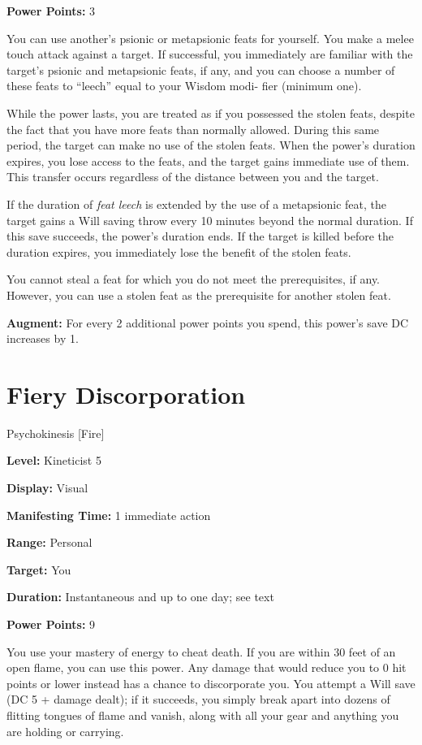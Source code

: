 \documentclass{article}
\begin{document}
\textbf{Power Points:} 3

You can use another's psionic or metapsionic feats for yourself. You make a melee 
touch attack against a target. If successful, you immediately are familiar with 
the target's psionic and metapsionic feats, if any, and you can choose a number 
of these feats to ``leech'' equal to your Wisdom modi- fier (minimum one).

While the power lasts, you are treated as if you possessed the stolen feats, despite 
the fact that you have more feats than normally allowed. During this same period, 
the target can make no use of the stolen feats. When the power's duration expires, 
you lose access to the feats, and the target gains immediate use of them. This 
transfer occurs regardless of the distance between you and the target.

If the duration of \textit{feat leech }is extended by the use of a metapsionic 
feat, the target gains a Will saving throw every 10 minutes beyond the normal duration. 
If this save succeeds, the power's duration ends. If the target is killed before 
the duration expires, you immediately lose the benefit of the stolen feats.

You cannot steal a feat for which you do not meet the prerequisites, if any. However, 
you can use a stolen feat as the prerequisite for another stolen feat.

\textbf{Augment:} For every 2 additional power points you spend, this power's save 
DC increases by 1. 

\vspace{12pt}
\section*{Fiery Discorporation}

Psychokinesis [Fire]

\textbf{Level:} Kineticist 5

\textbf{Display:} Visual

\textbf{Manifesting Time:} 1 immediate action

\textbf{Range:} Personal

\textbf{Target:} You

\textbf{Duration:} Instantaneous and up to one day; see text

\textbf{Power Points:} 9

You use your mastery of energy to cheat death. If you are within 30 feet of an 
open flame, you can use this power. Any damage that would reduce you to 0 hit points 
or lower instead has a chance to discorporate you. You attempt a Will save (DC 
5 + damage dealt); if it succeeds, you simply break apart into dozens of flitting 
tongues of flame and vanish, along with all your gear and anything you are holding 
or carrying.
\end{document}
